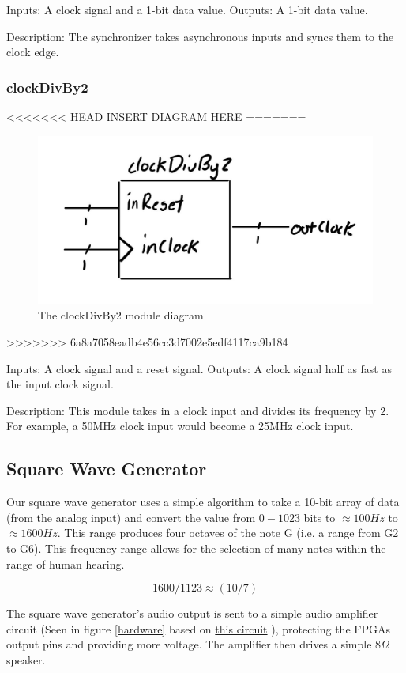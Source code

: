 \documentclass[a4paper]{article}
\begin{document}
Inputs: A clock signal and a 1-bit data value.
Outputs: A 1-bit data value.

Description: The synchronizer takes asynchronous inputs and syncs them to the clock edge.

\subsubsection{clockDivBy2}

<<<<<<< HEAD
INSERT DIAGRAM HERE
=======
\begin{figure}[H]
    \includegraphics[width=0.8 \linewidth]{images/clockDivBy2.JPG}
    \caption{The clockDivBy2 module diagram}
    \label{clockDivBy2Diagram}
\end{figure}
>>>>>>> 6a8a7058eadb4e56cc3d7002e5edf4117ca9b184

Inputs: A clock signal and a reset signal.
Outputs: A clock signal half as fast as the input clock signal.

Description: This module takes in a clock input and divides its frequency by 2. For example, a 50MHz clock input would become a 25MHz clock input.

\subsection{Square Wave Generator}
Our square wave generator uses a simple algorithm to take a 10-bit array of data (from the analog input) and convert the value from $0-1023 $ bits to $\approx 100Hz $ to$ \approx 1600 Hz$. This range produces four octaves of the note G (i.e. a range from G2 to G6). This frequency range allows for the selection of many notes within the range of human hearing. 


\begin{equation}
1600/1123 \approx (10/7)
\end{equation}

The square wave generator's audio output is sent to a simple audio amplifier circuit (Seen in figure \ref{hardware} based on \href{https://www.instructables.com/id/Tales-From-the-Chip-LM386-Audio-Amplifier/}{this circuit} ), protecting the FPGAs output pins and providing more voltage. The amplifier then drives a simple 8$\Omega$ speaker. 
\end{document}
